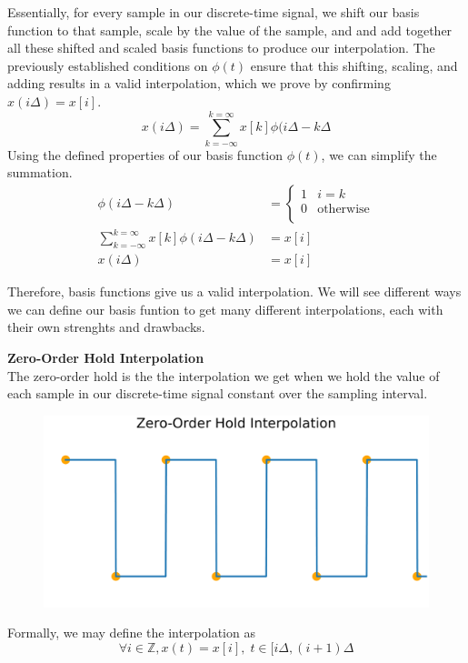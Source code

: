 Essentially, for every sample in our discrete-time signal, we shift our basis function to that sample, scale by the value of the sample, and and add together all these shifted and scaled basis functions to produce our interpolation. The previously established conditions on $\phi(t)$ ensure that this shifting, scaling, and adding results in a valid interpolation, which we prove by confirming $x(i \Delta) = x[i]$.
\begin{equation*}
    x(i \Delta) = \sum_{k=-\infty}^{k=\infty} x[k] \phi(i \Delta - k \Delta
\end{equation*}
Using the defined properties of our basis function $\phi(t)$, we can simplify the summation.
\begin{align*}
\phi(i \Delta - k \Delta)
    &=
    \begin{cases}
        1 & i = k \\
        0 & \text{otherwise} \\
    \end{cases} \\
\sum_{k=-\infty}^{k=\infty} x[k] \phi(i \Delta - k \Delta) &= x[i] \\
x(i \Delta) &= x[i]
\end{align*}

Therefore, basis functions give us a valid interpolation. We will see different ways we can define our basis funtion to get many different interpolations, each with their own strenghts and drawbacks.

\textbf{Zero-Order Hold Interpolation} \\
The zero-order hold is the the interpolation we get when we hold the value of each sample in our discrete-time signal constant over the sampling interval.


\begin{figure}[H]
\centering
\includegraphics[width=.8\textwidth]{figures/zoh_interp}
\end{figure}

Formally, we may define the interpolation as
\begin{equation*}
    \forall i \in \mathbb{Z}, x(t) = x[i],\;t \in [i \Delta, (i + 1) \Delta
\end{equation*}

